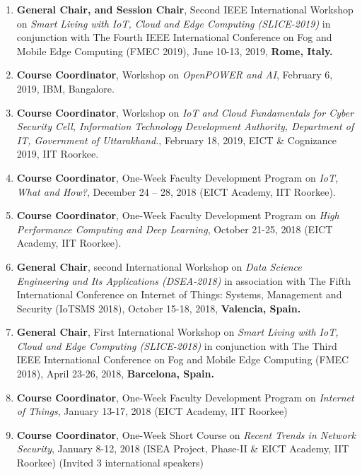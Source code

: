 \begin{enumerate}
\item 
\textbf{General Chair, and Session Chair}, Second IEEE International Workshop on \textit{Smart Living with IoT, Cloud and Edge Computing (SLICE-2019)} in conjunction with The Fourth IEEE International Conference on Fog and Mobile Edge Computing (FMEC 2019), June 10-13, 2019, \textbf{Rome, Italy.}

\item 
\textbf{Course Coordinator}, Workshop on \textit{OpenPOWER and AI}, February 6, 2019, IBM, Bangalore.

\item 
\textbf{Course Coordinator}, Workshop on \textit{IoT and Cloud Fundamentals for Cyber Security Cell, Information Technology Development Authority, Department of IT, Government of Uttarakhand.}, February 18, 2019, EICT \& Cognizance 2019, IIT Roorkee.

\item 
\textbf{Course Coordinator}, One-Week Faculty Development Program on \textit{IoT, What and How?}, December 24 – 28, 2018 (EICT Academy, IIT Roorkee).

\item 
\textbf{Course Coordinator}, One-Week Faculty Development Program on \textit{High Performance Computing and Deep Learning}, October 21-25, 2018 (EICT Academy, IIT Roorkee).

\item 
\textbf{General Chair}, second International Workshop on \textit{Data Science Engineering and Its Applications (DSEA-2018)} in association with The Fifth International Conference on Internet of Things: Systems, Management and Security (IoTSMS 2018), October 15-18, 2018, \textbf{Valencia, Spain.}

\item 
\textbf{General Chair}, First International Workshop on \textit{Smart Living with IoT, Cloud and Edge Computing (SLICE-2018)} in conjunction with The Third IEEE International Conference on Fog and Mobile Edge Computing (FMEC 2018), April 23-26, 2018, \textbf{Barcelona, Spain.}

\item
\textbf{Course Coordinator}, One-Week Faculty Development Program on \textit{Internet of Things}, January 13-17, 2018 (EICT Academy, IIT Roorkee)

\item
\textbf{Course Coordinator}, One-Week Short Course on \textit{Recent Trends in Network Security}, January 8-12, 2018 (ISEA Project, Phase-II \& EICT Academy, IIT Roorkee) (Invited 3 international speakers)


\end{enumerate}
